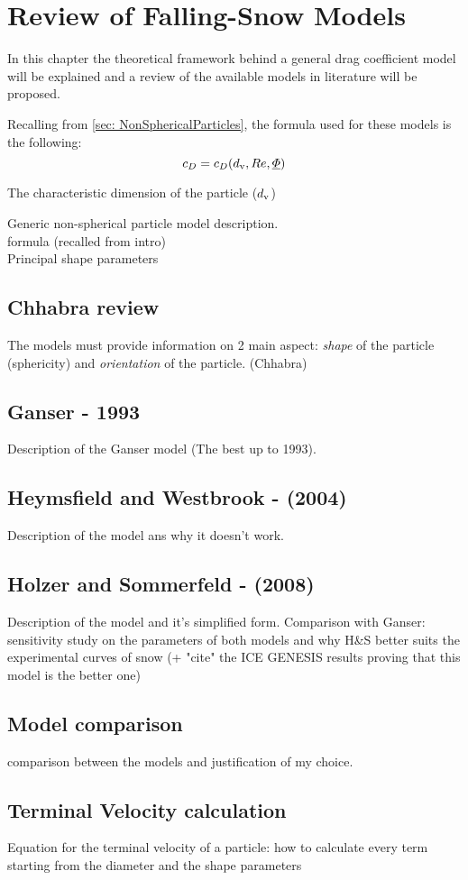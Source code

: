 
\chapter{Review of Falling-Snow Models}
	In this chapter the theoretical framework behind a general drag coefficient model will be explained and a review of the available models in literature will be proposed. 
	
	Recalling from \ref{sec: NonSphericalParticles}, the formula used for these models is the following:
	\begin{equation}
		c_D = c_D(d_{\textup{v}}, Re, \underline{\varPhi})
	\end{equation}
	
	The characteristic dimension of the particle ($ d_{\textup{v}} $) 
	
	
	Generic non-spherical particle model description.\\
	formula (recalled from intro)\\
	Principal shape parameters

	\section{Chhabra review}
		The models must provide information on 2 main aspect: \textit{shape} of the particle (sphericity) and \textit{orientation} of the particle. (Chhabra)
		
	\section{Ganser - 1993}	
		Description of the Ganser model (The best up to 1993).
				
	\section{Heymsfield and Westbrook - (2004)}
		Description of the model ans why it doesn't work.
		
	\section{Holzer and Sommerfeld - (2008)}
		Description of the model and it's simplified form. Comparison with Ganser: sensitivity study on the parameters of both models and why H\&S better suits the experimental curves of snow
		(+ "cite" the ICE GENESIS results proving that this model is the better one)
		
	\section{Model comparison}
		comparison between the models and justification of my choice.
	
	\section{Terminal Velocity calculation}
		Equation for the terminal velocity of a particle: how to calculate every term starting from the diameter and the shape parameters
	
